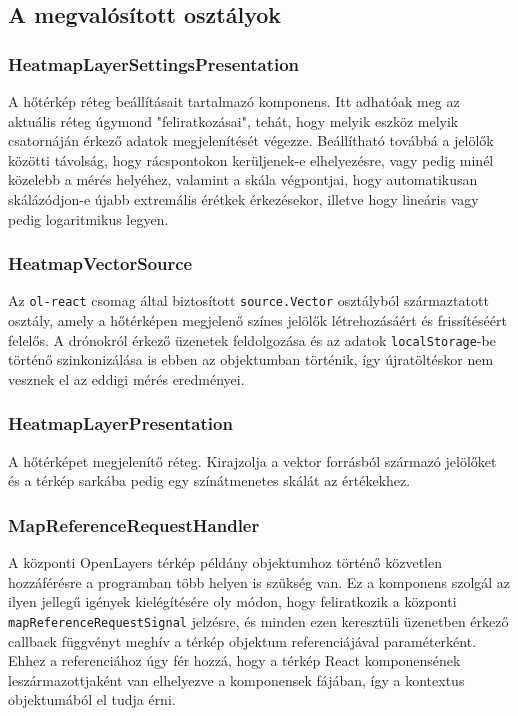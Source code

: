 \subsection{A megvalósított osztályok}

\subsubsection{HeatmapLayerSettingsPresentation}
A hőtérkép réteg beállításait tartalmazó komponens.
Itt adhatóak meg az aktuális réteg úgymond "feliratkozásai", tehát, hogy melyik
eszköz melyik csatornáján érkező adatok megjelenítését végezze.
Beállítható továbbá a jelölők közötti távolság, hogy rácspontokon kerüljenek-e
elhelyezésre, vagy pedig minél közelebb a mérés helyéhez, valamint a skála
végpontjai, hogy automatikusan skálázódjon-e újabb extremális érétkek
érkezésekor, illetve hogy lineáris vagy pedig logaritmikus legyen.

\subsubsection{HeatmapVectorSource}
Az \verb|ol-react| csomag által biztosított \verb|source.Vector| osztályból
származtatott osztály, amely a hőtérképen megjelenő színes jelölők
létrehozásáért és frissítéséért felelős.
A drónokról érkező üzenetek feldolgozása és az adatok \verb|localStorage|-be
történő szinkonizálása is ebben az objektumban történik, így újratöltéskor nem
vesznek el az eddigi mérés eredményei.

\subsubsection{HeatmapLayerPresentation}
A hőtérképet megjelenítő réteg. Kirajzolja a vektor forrásból származó jelölőket
és a térkép sarkába pedig egy színátmenetes skálát az értékekhez.

\subsubsection{MapReferenceRequestHandler}
A központi OpenLayers térkép példány objektumhoz történő közvetlen hozzáférésre
a programban több helyen is szükség van. Ez a komponens szolgál az ilyen jellegű
igények kielégítésére oly módon, hogy feliratkozik a központi
\verb|mapReferenceRequestSignal| jelzésre, és minden ezen keresztüli üzenetben
érkező callback függvényt meghív a térkép objektum referenciájával
paraméterként. Ehhez a referenciához úgy fér hozzá, hogy a térkép React
komponensének leszármazottjaként van elhelyezve a komponensek fájában, így a
kontextus objektumából el tudja érni.

